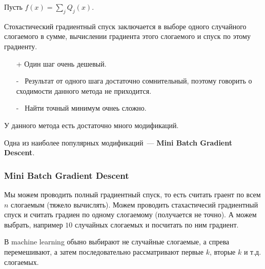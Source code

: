 \begin{definition}
    Пусть $f(x) = \sum\limits_j Q_j (x)$.

    Стохастический градиентный спуск заключается в выборе одного случайного слогаемого в сумме, вычислении градиента этого слогаемого и спуск по этому градиенту.
\end{definition}

\begin{itemize}
    \item[+] Один шаг очень дешевый.
    \item[-~] Результат от одного шага достаточно сомнительный,  поэтому говорить о сходимости данного метода не приходится.
    \item[-~] Найти точный минимум очнеь сложно.
\end{itemize}

У данного метода есть достаточно много модификаций.

Одна из наиболее популярных модификаций~--- \textbf{Mini Batch Gradient Descent}.
\subsubsection{Mini Batch Gradient Descent}
Мы можем проводить полный градиентный спуск, то есть считать граент по всем $n$ слогаемым (тяжело вычислять). Можем проводить стахастичесий градиентный спуск и считать градиен по одному слогаемому (получается не точно). А можем выбрать, например $10$ случайных слогаемых и посчитать по ним градиент.

В machine learning обыно выбирают не случайные слогаемые, а спрева перемешивают, а затем последовательно рассматривают первые $k$, вторые $k$ и т.д. слогаемых.
